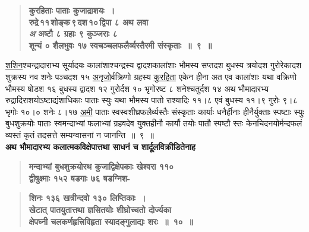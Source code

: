\documentclass[11pt, openany]{book}
\begin{document}
\newpage

 \label{6.9}
\begin{quote}
{\large \textbf{{\color{purple}कुरहिताः पाताः कुजाद्राशयः~।\\ 
रुद्रे\textendash \,११\textendash \,शोङ्क\textendash \,९\textendash \,दश\textendash \,१०\textendash \,द्विपा ८ अथ लवा \\
\emph{\color{white}अ} \hfill अष्टौ ८ ग्रहाः ९ कुञ्जराः ८ \\
शून्यं ० शैलभुवः १७ स्वचञ्चलफलैर्व्यस्तैरमी संस्कृताः~॥~९~॥}}}
\end{quote}

\begin{sloppypar}
\hyperref[6.9.1]{शशिन}श्चन्द्रादाराभ्य सूर्यादयः कालांशाश्चन्द्रस्य द्वादशकालांशाः भौमस्य सप्तदश बुधस्य त्रयोदश गुरोरेकादश शुक्रस्य नव शनेः पञ्चदश १५ \hyperref[6.9.1]{अनृजो}र्वक्रिणो ग्रहस्य \hyperref[6.9]{कुरहिता} एकेन हीना अत एव कालांशाः यथा वक्रिणो भौमस्य षोडश १६ बुधस्य द्वादश १२ गुरोर्दश १० भृगोरष्ट ८ शनेश्चतुर्दश १४ अथ भौमादारभ्य रुद्रादिराशयोऽष्टाद्यंशाधिकाः पाताः स्युः यथा भौमस्य पातो राश्यादिः ११।८ एवं बुधस्य ११।९ गुरोः ९।८ भृगोः १०।० शनेः ८।१७ \hyperref[6.9]{अमी} पाताः स्वस्वशीघ्रफलैर्व्यस्तैः संस्कृताः कार्याः धनैर्हीनाः हीनैर्युक्ताः स्पष्टाः स्युः बुधशुक्रयोः पाताः स्वमन्दाभ्यां फलाभ्यां ग्रहवदेव युक्तहीनौ कार्यौ तयोः पातौ स्पष्टौ स्तः केनचिदनयोर्मन्दफलं व्यस्तं कृतं तदसत्ते सम्यग्वासनां न जानन्ति~॥~९~॥\\

{\small \textbf{अथ भौमादारभ्य कलात्मकविक्षेपात्तथा साधनं च शार्दूलविक्रीडितेनाह\textendash }}

 \label{6.10.1}
\begin{quote}
{\large \textbf{{\color{purple}मन्दाभ्यां बुधशुक्रयोरथ कुजाद्विक्षेपकाः खेश्वरा ११० \\
द्वीषुक्ष्माः १५२ षडगाः ७६ षडग्निश-}}}
\end{quote}
\end{sloppypar}

\newpage

 \label{6.10}
\begin{quote}
{\large \textbf{{\color{purple}शिनः १३६ खत्रीन्दवो १३० लिप्तिकाः~।\\
खेटात् पातयुतात्तथा ज्ञसितयोः शीघ्रोच्चतो दोर्ज्यका \\
क्षेपघ्नी चलकर्णहृत्त्रिविहृता स्यादङ्गुलाद्यः शरः~॥~१०~॥}}}
\end{quote}
\end{document}

